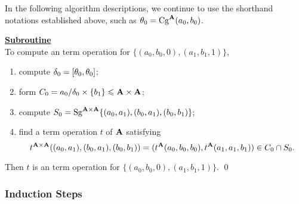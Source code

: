 In the following algorithm descriptions,
we continue to use the shorthand notations established above, 
such as $\theta_0 = \operatorname{Cg}^{\mathbf{A}}(a_0, b_0)$.

\bigskip

\noindent \underline{\textbf{Subroutine }}\\
To compute an \ld term operation for $\{(a_0,b_0,0), (a_1, b_1, 1)\}$,
\begin{enumerate}
\item compute $\delta_0=[\theta_0, \theta_0]$;
\item form $C_0= a_0/\delta_0 \times \{b_1\} \leqslant \mathbf{A}\times\mathbf{A}$;
\item compute
      $S_0=\operatorname{Sg}^{\mathbf{A}\times \mathbf{A}} \{(a_0,a_1),(b_0,a_1),(b_0,b_1)\}$;
\item find a term operation $t$ of $\mathbf{A}$ satisfying
\[t^{\mathbf{A}\times\mathbf{A}}((a_0,a_1),(b_0,a_1),(b_0,b_1)) =
 (t^{\mathbf{A}}(a_0,b_0,b_0), t^{\mathbf{A}}(a_1,a_1,b_1)) \in C_0 \cap S_0.\]
\end{enumerate}
Then $t$ is an \ld term operation for
$\{(a_0, b_0, 0), (a_1, b_1, 1)\}$.
\qed

\begin{comment}
\medskip
\noindent \underline{\textbf{Subroutine \ld-2'}}\\[4pt]
To compute an \ld term operation for
$\{(a_0,b_0,1), (a_1, b_1, 0)\}$, obviously this is symmetric to
the situation handled in Subroutine LD2 and so the general algorithm
is the same.  Nonetheless, we include a listing of the computational 
steps required so that later we can easily refer to this special case 
of the general algorithm.
\begin{enumerate}
\item Compute $\delta_1=\com{\theta_1}$;
\item form $C_1= \{b_0\}\times a_1/\delta_1 \leq \alg{A}\times\alg{A}$;
\item compute
      $S_1=\Sg^{\alg{A}\times \alg{A}} \{(a_0,a_1),(a_0,b_1),(b_0,b_1)\}$;
\item find a term operation $t$ of $\alg{A}$ satisfying
\[t^{\alg{A}\times\alg{A}}((a_0,a_1),(a_0,b_1),(b_0,b_1)) =
 (t^{\alg{A}}(a_0,a_0,b_0), t^{\alg{A}}(a_1,b_1,b_1)) \in C_1 \cap S_1.\]
\end{enumerate}
Then $t$ is an \ld term operation for
$\{(a_0, b_0, 1), (a_1, b_1, 0)\}$.
\end{comment}

\subsubsection{Induction Steps}
\label{sec:induct}

